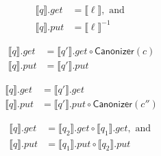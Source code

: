 \documentclass{svproc}
\newcommand{\kw}[1]{\ensuremath{\mathsf{#1}}}
\newcommand{\canonizer}{\ensuremath{\kw{Canonizer}}}
\begin{document}
 \begin{figure}[t]
  \centering
  \begin{prooftree}
\end{prooftree}
  \begin{align*}
  \llbracket q \rrbracket.get &=  \llbracket \ell \rrbracket, \text{ and }\\
  \llbracket q \rrbracket.put &= \llbracket \ell \rrbracket^{-1}
  \end{align*}
 
\begin{prooftree}
\end{prooftree}
  \begin{align*}
  \llbracket q \rrbracket.get  &= \llbracket q'
  \rrbracket.get \circ \canonizer(c)\\
  \llbracket q \rrbracket.put &= \llbracket q' \rrbracket.put
  \end{align*}

  \begin{prooftree}
  
\end{prooftree}
  \begin{align*}
  \llbracket q \rrbracket.get &= \llbracket q'
  \rrbracket.get\\
  \llbracket q \rrbracket.put &= \llbracket q'
  \rrbracket.put \circ \canonizer(c'')
  \end{align*}
  
  \begin{prooftree}
\end{prooftree}
  \begin{align*}
  \llbracket q \rrbracket.get &= \llbracket q_2 \rrbracket.get\circ \llbracket
  q_1 \rrbracket.get, \text{ and }\\
  \llbracket q \rrbracket.put &= \llbracket q_1 \rrbracket.put \circ \llbracket
  q_2 \rrbracket.put
  \end{align*}


\end{figure}
\end{document}
